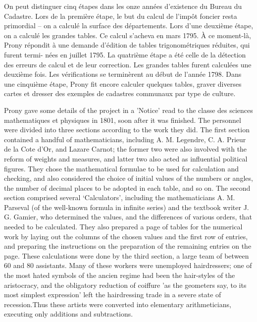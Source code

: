 \documentclass[version=last,draft=true,paper=A4,portrait,twoside=true,twocolumn=false,headinclude=false,footinclude=false,fontsize=12,BCOR=20mm,DIV=calc,pagesize=auto,titlepage=firstiscover,mpinclude=true,open=right,chapterprefix=true,numbers=autoendperiod,headsepline=false,headings=twolinechapter,parskip=false]{scrbook}
\begin{document}
On peut distinguer cinq étapes dans les onze années d’existence du Bureau
du Cadastre. Lors de la première étape, le but du calcul de l’impôt foncier
resta primordial – on a calculé la surface des départements. Lors d’une
deuxième étape, on a calculé les grandes tables. Ce calcul s’acheva en
mars 1795. À ce moment-là, Prony répondit à une demande d’édition de tables
trigonométriques réduites, qui furent termi- nées en juillet 1795. La
quatrième étape a été celle de la détection des erreurs de calcul et de
leur correction. Les grandes tables furent calculées une deuxième fois. Les
vérifications se terminèrent au début de l’année 1798. Dans une cinquième
étape, Prony fit encore calculer quelques tables, graver diverses cartes et
dresser des exemples de cadastres communaux par type de culture.


 Prony gave some details of the project in a 'Notice' read to the classe
des sciences mathematiques et physiques in 1801, soon after it was
finished. The personnel were divided into three sections according to the
work they did. The first section contained a handful of mathematicians,
including A. M. Legendre, C. A. Prieur de la Cote d'Or, and Lazare Carnot;
the former two were also involved with the reform of weights and measures,
and latter two also acted as influential political figures. They chose the
mathematical formulae to be used for calculation and checking, and also
considered the choice of initial values of the numbers or angles, the
number of decimal places to be adopted in each table, and so on. The second
section comprised several `Calculators', including the
mathematicians A. M. Parseval (of the well-known formula in infinite
series) and the textbook writer J. G. Gamier, who determined the values,
and the differences of various orders, that needed to be calculated. They
also prepared a page of tables for the numerical work by laying out the
columns of the chosen values and the first row of entries, and preparing
the instructions on the preparation of the remaining entries on the page.
These calculations were done by the third section, a large team of between
60 and 80 assistants. Many of these workers were unemployed hairdressers;
one of the most hated symbols of the ancien regime had been the hair-styles
of the aristocracy, and the obligatory reduction of coiffure 'as the
geometers say, to its most simplest expression' left the hairdressing trade
in a severe state of recession.Thus these artists were converted into
elementary arithmeticians, executing only additions and subtractions.
\end{document}
